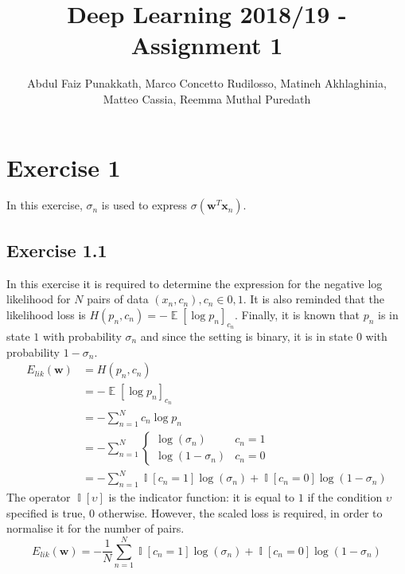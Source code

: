 \documentclass[fleqn]{article}
\title{Deep Learning 2018/19 - Assignment 1}
\author{Abdul Faiz Punakkath, Marco Concetto Rudilosso, Matineh Akhlaghinia,\\Matteo Cassia, Reemma Muthal Puredath}
\renewcommand{\vec}[1]{\mathbf{#1}}
\DeclareMathOperator{\E}{\mathbb{E}}
\DeclareMathOperator{\I}{\mathbb{I}}
\begin{document}
\maketitle

\section*{Exercise 1}
In this exercise, $\sigma_n$ is used to express $\sigma \left( \vec{w}^T \vec{x}_n \right )$.

\subsection*{Exercise 1.1}
In this exercise it is required to determine the expression for the negative log likelihood for $N$ pairs of data $(x_n, c_n), c_n \in {0, 1}$. It is also reminded that the likelihood loss is $H(p_n, c_n) = - \E[\log p_n]_{c_n}$. Finally, it is known that $p_n$ is in state $1$ with probability $\sigma_n$ and since the setting is binary, it is in state $0$ with probability $1 - \sigma_n$.
\begin{equation}
    \begin{split}
        E_{lik}(\vec{w}) & = H(p_n, c_n) \\
        & = - \E[\log p_n]_{c_n} \\
        & = - \sum_{n=1}^N c_n \log p_n \\
        & = - \sum_{n=1}^N
        \begin{cases}
            \log \left( \sigma_n \right) & c_n = 1 \\
            \log \left(1 - \sigma_n \right) & c_n = 0
        \end{cases}
        \\ & = - \sum_{n=1}^N \I[c_n = 1] \log (\sigma_n) + \I[c_n = 0] \log (1 - \sigma_n)
    \end{split}
\end{equation}
The operator $\I[\upsilon]$ is the indicator function: it is equal to $1$ if the condition $\upsilon$ specified is true, $0$ otherwise. However, the scaled loss is required, in order to normalise it for the number of pairs.
\begin{equation}
    E_{lik}(\vec{w}) = - \frac{1}{N} \sum_{n=1}^N \I[c_n = 1] \log (\sigma_n) + \I[c_n = 0] \log (1 - \sigma_n)
\end{equation}
\end{document}
